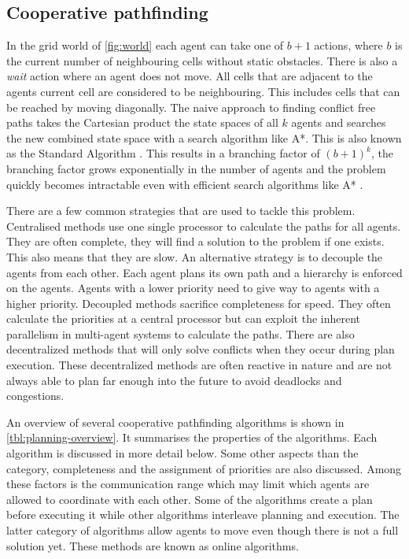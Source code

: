 \subsection{Cooperative pathfinding}
In the grid world of \autoref{fig:world} each agent can take one of $b+1$
actions, where $b$ is the current number of neighbouring cells without static
obstacles. There is also a \textit{wait} action
where an agent does not move. All cells that are adjacent to the agents current
cell are considered to be neighbouring. This includes cells that can be reached
by moving diagonally. The naive approach to finding conflict free paths takes
the Cartesian product the state spaces of all $k$ agents and searches the new
combined state space with a search algorithm like A*. This is also known as the
Standard Algorithm \cite{standley2010}. This results in a branching factor of
$(b+1)^k$, the branching factor grows exponentially in the number of agents and
the problem quickly becomes intractable even with efficient search algorithms
like A* \cite{sharon2013}.

There are a few common strategies that are used to tackle this problem.
Centralised methods use one single processor to calculate the paths for all
agents. They are often complete, they will find a solution to the problem if
one exists. This also means that they are slow. An alternative strategy is to
decouple the agents from each other. Each agent plans its own path and a
hierarchy is enforced on the agents. Agents with a lower priority need
to give way to agents with a higher priority. Decoupled methods sacrifice
completeness for speed. They often calculate the priorities at a central
processor but can exploit the inherent parallelism in multi-agent systems to
calculate the paths. There are also decentralized methods that will only solve
conflicts when they occur during plan execution. These decentralized methods
are often reactive in nature and are not always able to plan far enough into
the future to avoid deadlocks and congestions.

An overview of several cooperative pathfinding algorithms is shown in
\autoref{tbl:planning-overview}. It summarises the properties of the
algorithms. Each algorithm is discussed in more detail below. Some other
aspects than the category, completeness and the assignment of priorities are
also discussed. Among these factors is the communication range which may limit
which agents are allowed to coordinate with each other. Some of the algorithms
create a plan before executing it while other algorithms interleave planning
and execution. The latter category of algorithms allow agents to move even
though there is not a full solution yet. These methods are known as online
algorithms.


